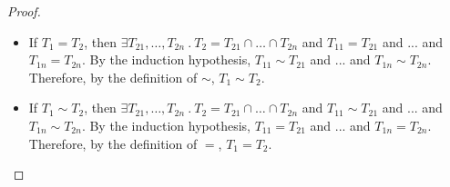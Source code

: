 \documentclass[a4paper]{article}
\begin{document}
\begin{proof}
\begin{itemize}
    \begin{itemize}
        \item If $T_1 = T_2$, then $\exists T_{21}, \ldots, T_{2n}\ .\ T_2 = T_{21} \cap \ldots \cap T_{2n}$ and $T_{11} = T_{21}$ and ... and $T_{1n} = T_{2n}$.
        By the induction hypothesis, $T_{11} \sim T_{21}$ and ... and $T_{1n} \sim T_{2n}$.
        Therefore, by the definition of $\sim$, $T_1 \sim T_2$.
        \item If $T_1 \sim T_2$, then $\exists T_{21}, \ldots, T_{2n}\ .\ T_2 = T_{21} \cap \ldots \cap T_{2n}$ and $T_{11} \sim T_{21}$ and ... and $T_{1n} \sim T_{2n}$.
        By the induction hypothesis, $T_{11} = T_{21}$ and ... and $T_{1n} = T_{2n}$.
        Therefore, by the definition of $=$, $T_1 = T_2$.
    \end{itemize}
\end{itemize}
\end{proof}
\end{document}
